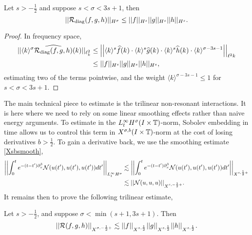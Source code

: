 \begin{proposition}
    Let $s > -\tfrac12$ and suppose $s < \sigma < 3s + 1$, then 
        \begin{equation}\label{eq:resonantest}
            || \mathcal R_{\operatorname{diag}}(f, g, h) ||_{H^\sigma}
                \leq ||f||_{H^s} ||g||_{H^s} ||h||_{H^s}. 
        \end{equation}
\end{proposition}

\begin{proof}
    In frequency space, 
        \begin{align*}
            || \langle k \rangle^{\sigma} \widehat{\mathcal R_{\operatorname{diag}}(f, g, h)} (k) ||_{\ell^2_k}
                &\leq  \left|\left| \langle k \rangle^s \widehat f(k) \cdot \langle k \rangle^s \widehat g(k) \cdot \langle k \rangle^s \widehat h(k) \cdot \langle k\rangle^{\sigma - 3s - 1}\right|\right|_{\ell^2k}\\ 
                &\leq ||f||_{H^s} ||g||_{H^s} ||h||_{H^s},
        \end{align*}
    estimating two of the terms pointwise, and the weight $\langle k \rangle^{\sigma - 3s - 1} \leq 1$ for $s < \sigma < 3s + 1$.  
\end{proof}

The main technical piece to estimate is the trilinear non-resonant interactions. It is here where we need to rely on some linear smoothing effects rather than naive energy arguments. To estimate in the $L^\infty_t H^\sigma (I \times \mathbb T)$-norm, Sobolev embedding in time allows us to control this term in $X^{\sigma, b} (I \times \mathbb T)$-norm at the cost of losing derivatives $b > \tfrac12$. To gain a derivative back, we use the smoothing estimate \eqref{Xsbsmooth},
    \begin{align*}
        \left|\left| \int_0^t e^{- (t - t') \partial_x^3} \mathcal N(u(t'), u(t'), u(t')) dt'\right|\right|_{L^\infty_t H^\sigma}
            &\lesssim      \left|\left| \int_0^t e^{- (t - t') \partial_x^3} \mathcal N(u(t'), u(t'), u(t')) dt'\right|\right|_{X^{s, \frac12+}} \\
            &\lesssim ||\mathcal N(u, u, u)||_{X^{s, -\frac12 +}}. 
    \end{align*}
It remains then to prove the following trilinear estimate, 

\begin{proposition}
    Let $s > -\tfrac12$, and suppose $\sigma < \min (s + 1, 3s + 1)$. Then 
        \begin{equation}\label{eq:trilinear}
            ||\mathcal R(f, g, h) ||_{X^{\sigma, - \frac12 +}} 
                \lesssim ||f||_{X^{s, \frac12}} ||g||_{X^{s, \frac12}} ||h||_{X^{s, \frac12}}. 
        \end{equation}
\end{proposition}

